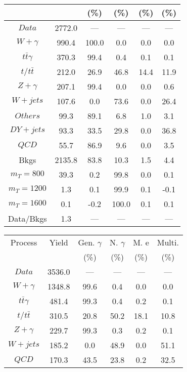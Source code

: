 \begin{figure}
\begin{minipage}[c]{0.32\textwidth}
{\begin{tabular}{cccccc}
 &  & (\%) & (\%) & (\%) & (\%)  \\
\hline
                                                                      $ Data $ &  2772.0 &  --- &  --- &  --- &  ---\\
$ W+\gamma $ &  990.4 &  100.0 &  0.0 &  0.0 &  0.0\\
$ t\bar{t}\gamma $ &  370.3 &  99.4 &  0.4 &  0.1 &  0.1\\
$ t/t\bar{t} $ &  212.0 &  26.9 &  46.8 &  14.4 &  11.9\\
$ Z+\gamma $ &  207.1 &  99.4 &  0.0 &  0.0 &  0.6\\
$ W+jets $ &  107.6 &  0.0 &  73.6 &  0.0 &  26.4\\
$ Others $ &  99.3 &  89.1 &  6.8 &  1.0 &  3.1\\
$ DY+jets $ &  93.3 &  33.5 &  29.8 &  0.0 &  36.8\\
$ QCD $ &  55.7 &  86.9 &  9.6 &  0.0 &  3.5\\
Bkgs &  2135.8 &  83.8 &  10.3 &  1.5 &  4.4\\
$ m_{T} = 800 $ &  39.3 &  0.2 &  99.8 &  0.0 &  0.1\\
$ m_{T} = 1200 $ &  1.3 &  0.1 &  99.9 &  0.1 &  -0.1\\
$ m_{T} = 1600 $ &  0.1 &  -0.2 &  100.0 &  0.1 &  0.1\\
Data/Bkgs &  1.3 &  --- &  --- &  --- &  ---\\
\hline
\end{tabular}
}
\end{minipage}
\begin{minipage}[c]{0.32\textwidth}
\centering
\tiny{
\begin{tabular}{cccccc}
\hline
Process & Yield & Gen. $\gamma$ & N. $\gamma$ & M. e & Multi. \\
 &  & (\%) & (\%) & (\%) & (\%)  \\
\hline
                                                                      $ Data $ &  3536.0 &  --- &  --- &  --- &  ---\\
$ W+\gamma $ &  1348.8 &  99.6 &  0.4 &  0.0 &  0.0\\
$ t\bar{t}\gamma $ &  481.4 &  99.3 &  0.4 &  0.2 &  0.1\\
$ t/t\bar{t} $ &  310.5 &  20.8 &  50.2 &  18.1 &  10.8\\
$ Z+\gamma $ &  229.7 &  99.3 &  0.3 &  0.2 &  0.1\\
$ W+jets $ &  185.2 &  0.0 &  48.9 &  0.0 &  51.1\\
$ QCD $ &  170.3 &  43.5 &  23.8 &  0.2 &  32.5\\

\end{tabular}}
\end{minipage}
\end{figure}

